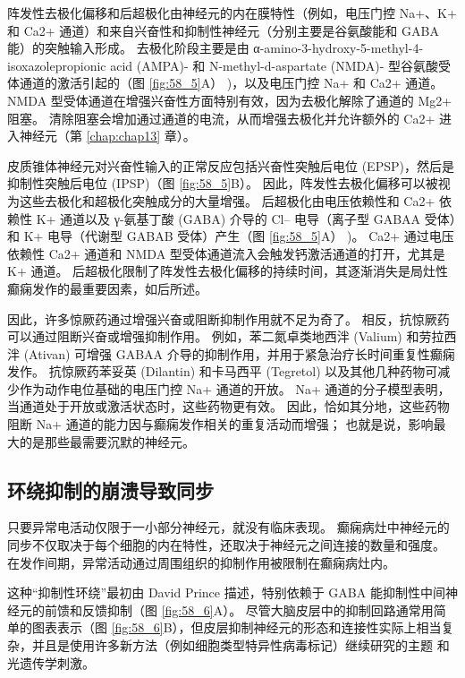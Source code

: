 阵发性去极化偏移和后超极化由神经元的内在膜特性（例如，电压门控 Na+、K+ 和 Ca2+ 通道）和来自兴奋性和抑制性神经元（分别主要是谷氨酸能和 GABA 能）的突触输入形成。
去极化阶段主要是由 α-amino-3-hydroxy-5-methyl-4-isoxazolepropionic acid (AMPA)- 和 N-methyl-d-aspartate (NMDA)- 型谷氨酸受体通道的激活引起的（图 \ref{fig:58_5}A） )，以及电压门控 Na+ 和 Ca2+ 通道。
NMDA 型受体通道在增强兴奋性方面特别有效，因为去极化解除了通道的 Mg2+ 阻塞。
清除阻塞会增加通过通道的电流，从而增强去极化并允许额外的 Ca2+ 进入神经元（第 \ref{chap:chap13} 章）。


皮质锥体神经元对兴奋性输入的正常反应包括兴奋性突触后电位 (EPSP)，然后是抑制性突触后电位 (IPSP)（图 \ref{fig:58_5}B）。
因此，阵发性去极化偏移可以被视为这些去极化和超极化突触成分的大量增强。
后超极化由电压依赖性和 Ca2+ 依赖性 K+ 通道以及 γ-氨基丁酸 (GABA) 介导的 Cl– 电导（离子型 GABAA 受体）和 K+ 电导（代谢型 GABAB 受体）产生（图 \ref{fig:58_5}A） )。
Ca2+ 通过电压依赖性 Ca2+ 通道和 NMDA 型受体通道流入会触发钙激活通道的打开，尤其是 K+ 通道。
后超极化限制了阵发性去极化偏移的持续时间，其逐渐消失是局灶性癫痫发作的最重要因素，如后所述。


因此，许多惊厥药通过增强兴奋或阻断抑制作用就不足为奇了。
相反，抗惊厥药可以通过阻断兴奋或增强抑制作用。 例如，苯二氮卓类地西泮 (Valium) 和劳拉西泮 (Ativan) 可增强 GABAA 介导的抑制作用，并用于紧急治疗长时间重复性癫痫发作。
抗惊厥药苯妥英 (Dilantin) 和卡马西平 (Tegretol) 以及其他几种药物可减少作为动作电位基础的电压门控 Na+ 通道的开放。 Na+ 通道的分子模型表明，当通道处于开放或激活状态时，这些药物更有效。
因此，恰如其分地，这些药物阻断 Na+ 通道的能力因与癫痫发作相关的重复活动而增强；
也就是说，影响最大的是那些最需要沉默的神经元。



\subsection{环绕抑制的崩溃导致同步}

只要异常电活动仅限于一小部分神经元，就没有临床表现。
癫痫病灶中神经元的同步不仅取决于每个细胞的内在特性，还取决于神经元之间连接的数量和强度。
在发作间期，异常活动通过周围组织的抑制作用被限制在癫痫病灶内。


这种“抑制性环绕”最初由 David Prince 描述，特别依赖于 GABA 能抑制性中间神经元的前馈和反馈抑制（图 \ref{fig:58_6}A）。
尽管大脑皮层中的抑制回路通常用简单的图表表示（图 \ref{fig:58_6}B），但皮层抑制神经元的形态和连接性实际上相当复杂，并且是使用许多新方法（例如细胞类型特异性病毒标记）继续研究的主题 和光遗传学刺激。


